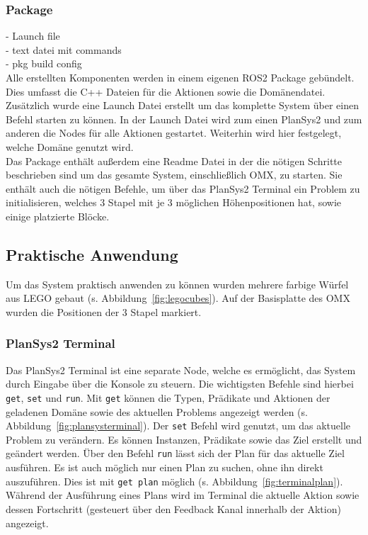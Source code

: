 \subsubsection{Package}
- Launch file\\
- text datei mit commands \\
- pkg build config\\
Alle erstellten Komponenten werden in einem eigenen \ac{ROS2} Package gebündelt.
Dies umfasst die C++ Dateien für die Aktionen sowie die Domänendatei.
Zusätzlich wurde eine Launch Datei erstellt um das komplette System über einen Befehl starten zu können.
In der Launch Datei wird zum einen \ac{PlanSys2} und zum anderen die Nodes für alle Aktionen gestartet.
Weiterhin wird hier festgelegt, welche Domäne genutzt wird.\\
Das Package enthält außerdem eine Readme Datei in der die nötigen Schritte beschrieben sind um das gesamte System, einschließlich OMX, zu starten.
Sie enthält auch die nötigen Befehle, um über das \ac{PlanSys2} Terminal ein Problem zu initialisieren, welches 3 Stapel mit je 3 möglichen Höhenpositionen hat, sowie einige platzierte Blöcke.


\subsection{Praktische Anwendung}
Um das System praktisch anwenden zu können wurden mehrere farbige Würfel aus LEGO gebaut (s. Abbildung~\ref{fig:legocubes}).
Auf der Basisplatte des OMX wurden die Positionen der 3 Stapel markiert.
\subsubsection{PlanSys2 Terminal}
Das \ac{PlanSys2} Terminal ist eine separate Node, welche es ermöglicht, das System durch Eingabe über die Konsole zu steuern.
Die wichtigsten Befehle sind hierbei \verb|get|, \verb|set| und \verb|run|.
Mit \verb|get| können die Typen, Prädikate und Aktionen der geladenen Domäne sowie des aktuellen Problems angezeigt werden (s. Abbildung~\ref{fig:plansysterminal}).
Der \verb|set| Befehl wird genutzt, um das aktuelle Problem zu verändern.
Es können Instanzen, Prädikate sowie das Ziel erstellt und geändert werden.
Über den Befehl \verb|run| lässt sich der Plan für das aktuelle Ziel ausführen.
Es ist auch möglich nur einen Plan zu suchen, ohne ihn direkt auszuführen.
Dies ist mit \verb|get plan| möglich (s. Abbildung~\ref{fig:terminalplan}).\\
Während der Ausführung eines Plans wird im Terminal die aktuelle Aktion sowie dessen Fortschritt (gesteuert über den Feedback Kanal innerhalb der Aktion) angezeigt.
